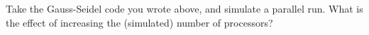   Take the Gauss-Seidel code you wrote above, and simulate a parallel
  run. What is the effect of increasing the (simulated) number of processors?
